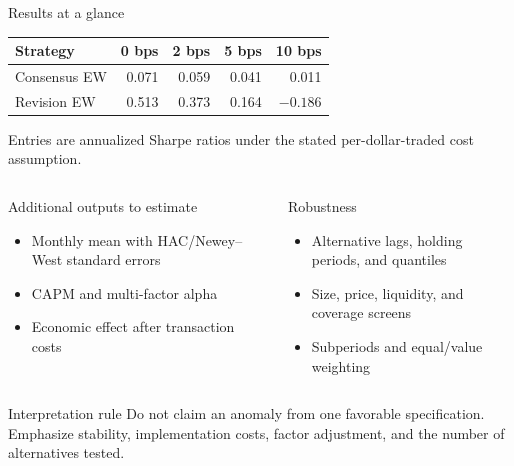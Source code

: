 \documentclass[aspectratio=169,10pt]{beamer}
\begin{document}
\begin{frame}[shrink=5]{Results at a glance}
\centering\small
\begin{tabular}{@{}lrrrr@{}}
\toprule
\textbf{Strategy} & \textbf{0 bps} & \textbf{2 bps} & \textbf{5 bps} & \textbf{10 bps} \\
\midrule
Consensus EW & 0.071 & 0.059 & 0.041 & 0.011 \\
Revision EW & 0.513 & 0.373 & 0.164 & $-0.186$ \\
\bottomrule
\end{tabular}
\par\scriptsize Entries are annualized Sharpe ratios under the stated per-dollar-traded cost assumption.
\vspace{0.4cm}
\begin{columns}[T,onlytextwidth]
\begin{block}{Additional outputs to estimate}
\begin{itemize}\setlength\itemsep{0.25em}
  \item Monthly mean with HAC/Newey--West standard errors
  \item CAPM and multi-factor alpha
  \item Economic effect after transaction costs
\end{itemize}
\end{block}
\begin{block}{Robustness}
\begin{itemize}\setlength\itemsep{0.25em}
  \item Alternative lags, holding periods, and quantiles
  \item Size, price, liquidity, and coverage screens
  \item Subperiods and equal/value weighting
\end{itemize}
\end{block}
\end{columns}
\begin{alertblock}{Interpretation rule}
Do not claim an anomaly from one favorable specification. Emphasize stability, implementation costs, factor adjustment, and the number of alternatives tested.
\end{alertblock}
\end{frame}
\end{document}
